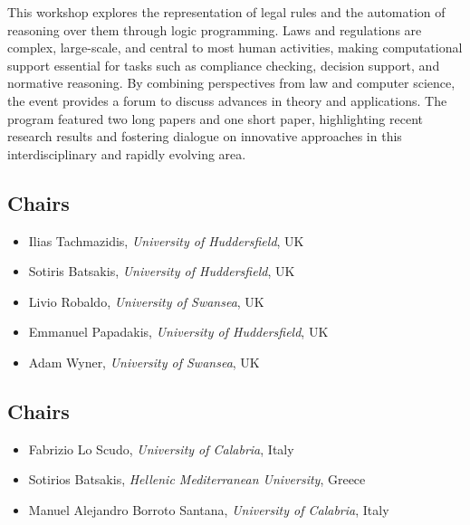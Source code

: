 \documentclass[
]{ceurart}
\begin{document}


\noindent
This workshop explores the representation of legal rules and the automation of reasoning over them through logic programming. Laws and regulations are complex, large-scale, and central to most human activities, making computational support essential for tasks such as compliance checking, decision support, and normative reasoning. By combining perspectives from law and computer science, the event provides a forum to discuss advances in theory and applications. The program featured two long papers and one short paper, highlighting recent research results and fostering dialogue on innovative approaches in this interdisciplinary and rapidly evolving area.

\subsection*{Chairs}
\begin{itemize}
\item Ilias Tachmazidis, \emph{University of Huddersfield}, UK

\item Sotiris Batsakis, \emph{University of Huddersfield}, UK

\item Livio Robaldo, \emph{University of Swansea}, UK

\item Emmanuel Papadakis, \emph{University of Huddersfield}, UK

\item Adam Wyner, \emph{University of Swansea}, UK
\end{itemize}


\subsection*{Chairs}
\begin{itemize}
\item Fabrizio Lo Scudo, \emph{University of Calabria}, Italy

\item Sotirios Batsakis, \emph{Hellenic Mediterranean University}, Greece

\item Manuel Alejandro Borroto Santana, \emph{University of Calabria}, Italy
\end{itemize}
\end{document}

